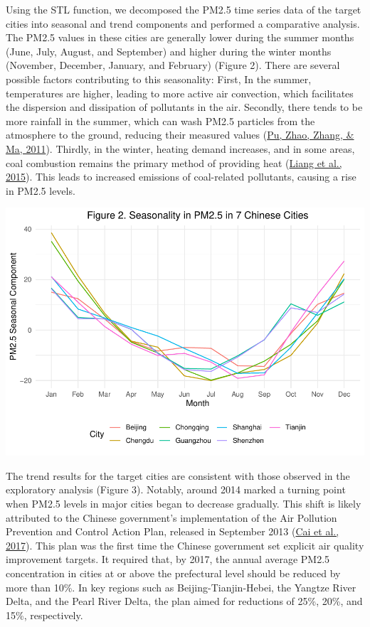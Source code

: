 \documentclass[
  12pt,
]{article}
\begin{document}
Using the STL function, we decomposed the PM2.5 time series data of the
target cities into seasonal and trend components and performed a
comparative analysis. The PM2.5 values in these cities are generally
lower during the summer months (June, July, August, and September) and
higher during the winter months (November, December, January, and
February) (Figure 2). There are several possible factors contributing to
this seasonality: First, In the summer, temperatures are higher, leading
to more active air convection, which facilitates the dispersion and
dissipation of pollutants in the air. Secondly, there tends to be more
rainfall in the summer, which can wash PM2.5 particles from the
atmosphere to the ground, reducing their measured values
(\protect\hyperlink{ref-rain}{Pu, Zhao, Zhang, \& Ma, 2011}). Thirdly,
in the winter, heating demand increases, and in some areas, coal
combustion remains the primary method of providing heat
(\protect\hyperlink{ref-heating}{Liang et al., 2015}). This leads to
increased emissions of coal-related pollutants, causing a rise in PM2.5
levels.

\includegraphics{LiFangRenZhang_ENV872_Project_files/figure-latex/seasonal figure-1.pdf}

The trend results for the target cities are consistent with those
observed in the exploratory analysis (Figure 3). Notably, around 2014
marked a turning point when PM2.5 levels in major cities began to
decrease gradually. This shift is likely attributed to the Chinese
government's implementation of the Air Pollution Prevention and Control
Action Plan, released in September 2013
(\protect\hyperlink{ref-plan}{Cai et al., 2017}). This plan was the
first time the Chinese government set explicit air quality improvement
targets. It required that, by 2017, the annual average PM2.5
concentration in cities at or above the prefectural level should be
reduced by more than 10\%. In key regions such as Beijing-Tianjin-Hebei,
the Yangtze River Delta, and the Pearl River Delta, the plan aimed for
reductions of 25\%, 20\%, and 15\%, respectively.
\end{document}
